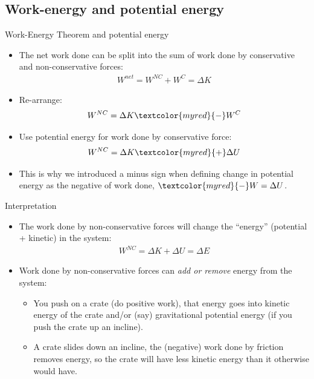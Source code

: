 \documentclass[aspectratio=169,
hyperref={colorlinks,urlcolor=blue}
]{beamer}
\begin{document}
\subsection{Work-energy and potential energy}
\label{subsec:workenergyandpotentialenergy}
\begin{frame}{Work-Energy Theorem and potential energy}
\begin{itemize}
\item The net work done can be  split into the sum of work done by conservative and non-conservative forces:
\begin{align*}
W^{net}=W^{NC}+W^{C}=\Delta K
\end{align*}
\item Re-arrange:
\begin{align*}
W^{NC}=\Delta K \textcolor{myred}{-}W^C
\end{align*}
\item Use potential energy for work done by conservative force:
\begin{align*}
W^{NC}=\Delta K \textcolor{myred}{+}\Delta U
\end{align*}
\item<2> This is why we introduced a minus sign when defining change in potential energy as the negative of work done, $\textcolor{myred}{-}W=\Delta U$.
\end{itemize}
\end{frame}


\begin{frame}{Interpretation}
\begin{itemize}
\item The work done by non-conservative forces will change the ``energy'' (potential + kinetic) in the system:
\begin{align*}
W^{NC}=\Delta K +\Delta U=\Delta E
\end{align*}
\item Work done by non-conservative forces can \textit{add or remove} energy from the system:
\begin{itemize}
\item You push on a crate (do positive work), that energy goes into kinetic energy of the crate and/or (say) gravitational potential energy (if you push the crate up an incline).
\item A crate slides down an incline, the (negative) work done by friction removes energy, so the crate will have less kinetic energy than it otherwise would have.

\end{itemize}

\end{itemize}
\end{frame}
\end{document}
